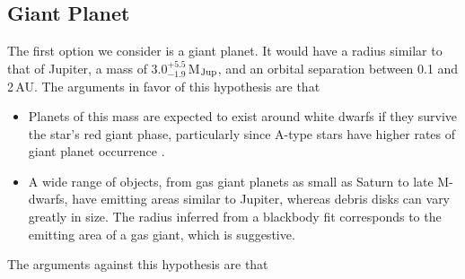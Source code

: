 \documentclass[twocolumn]{aastex631}
\begin{document}
\subsection{Giant Planet} 

The first option we consider is a giant planet. It would have a radius similar to that of Jupiter, a mass of $3.0^{+5.5}_{-1.9}$\,M$_{\rm Jup}$, and an orbital separation between 0.1 and 2\,AU. The arguments in favor of this hypothesis are that
\begin{itemize}
    \item Planets of this mass are expected to exist around white dwarfs if they survive the star's red giant phase, particularly since A-type stars have higher rates of giant planet occurrence \citep{Reffert2015}.
    \item {A wide range of objects, from gas giant planets as small as Saturn to late M-dwarfs, have emitting areas similar to Jupiter, whereas debris disks can vary greatly in size. The radius inferred from a blackbody fit corresponds to the emitting area of a gas giant, which is suggestive. }
\end{itemize}
The arguments against this hypothesis are that
\end{document}

